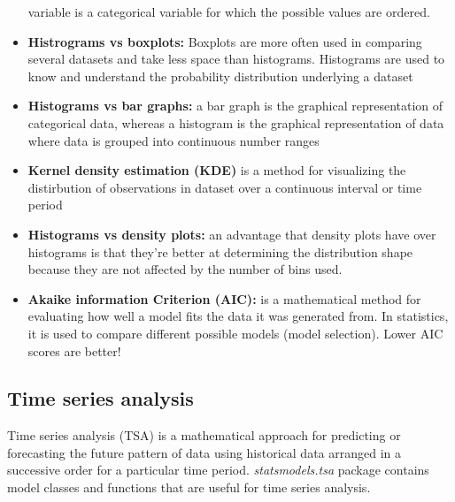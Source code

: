 \documentclass[
  letterpaper,
  DIV=11,
  numbers=noendperiod]{scrreprt}
\begin{document}
\begin{itemize}
  variable is a categorical variable for which the possible values are
  ordered.
\item
  \textbf{Histrograms vs boxplots:} Boxplots are more often used in
  comparing several datasets and take less space than histograms.
  Histograms are used to know and understand the probability
  distribution underlying a dataset
\item
  \textbf{Histograms vs bar graphs:} a bar graph is the graphical
  representation of categorical data, whereas a histogram is the
  graphical representation of data where data is grouped into continuous
  number ranges
\item
  \textbf{Kernel density estimation (KDE)} is a method for visualizing
  the distirbution of observations in dataset over a continuous interval
  or time period
\item
  \textbf{Histograms vs density plots:} an advantage that density plots
  have over histograms is that they're better at determining the
  distribution shape because they are not affected by the number of bins
  used.
\item
  \textbf{Akaike information Criterion (AIC):} is a mathematical method
  for evaluating how well a model fits the data it was generated from.
  In statistics, it is used to compare different possible models (model
  selection). Lower AIC scores are better!
\end{itemize}

\hypertarget{time-series-analysis}{%
\subsection{Time series analysis}\label{time-series-analysis}}

Time series analysis (TSA) is a mathematical approach for predicting or
forecasting the future pattern of data using historical data arranged in
a successive order for a particular time period. \emph{statsmodels.tsa}
package contains model classes and functions that are useful for time
series analysis.
\end{document}
